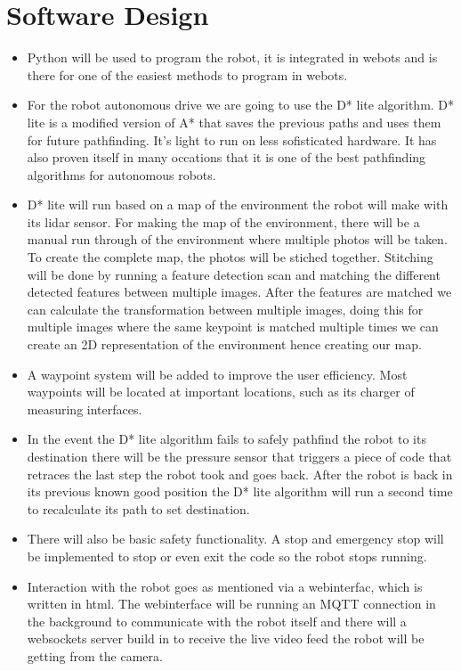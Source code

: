 \documentclass[a4paper]{article}
\begin{document}
\section*{Software Design}
\begin{itemize}
    \item Python will be used to program the robot, it is integrated in webots and is there for one of the easiest methods to program in webots.
    \item For the robot autonomous drive we are going to use the D* lite algorithm. D* lite is a modified version of A* that saves the previous paths and uses them for future pathfinding. It's light to run on less sofisticated hardware. It has also proven itself in many occations that it is one of the best pathfinding algorithms for autonomous robots.
    \item D* lite will run based on a map of the environment the robot will make with its lidar sensor. For making the map of the environment, there will be a manual run through of the environment where multiple photos will be taken. To create the complete map, the photos will be stiched together. Stitching will be done by running a feature detection scan and matching the different detected features between multiple images. After the features are matched we can calculate the transformation between multiple images, doing this for multiple images where the same keypoint is matched multiple times we can create an 2D representation of the environment hence creating our map.
    \item A waypoint system will be added to improve the user efficiency. Most waypoints will be located at important locations, such as its charger of measuring interfaces. 
    \item In the event the D* lite algorithm fails to safely pathfind the robot to its destination there will be the pressure sensor that triggers a piece of code that retraces the last step the robot took and goes back. After the robot is back in its previous known good position the D* lite algorithm will run a second time to recalculate its path to set destination.
    \item There will also be basic safety functionality. A stop and emergency stop will be implemented to stop or even exit the code so the robot stops running.
    \item Interaction with the robot goes as mentioned via a webinterfac, which is written in html. The webinterface will be running an MQTT connection in the background to communicate with the robot itself and there will a websockets server build in to receive the live video feed the robot will be getting from the camera.
\end{itemize}
\end{document}
